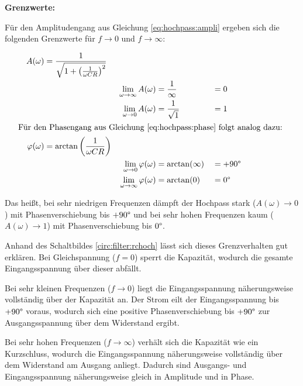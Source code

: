 \begin{frame}
{    \textbf{Grenzwerte:}

    Für den Amplitudengang aus Gleichung \ref{eq:hochpass:ampli} ergeben sich die folgenden Grenzwerte 
    für $f \rightarrow 0$ und $f \rightarrow \infty$:
    
    \begin{align}
        &&A(\omega) &=\frac{1}{\sqrt{1 + \left(\frac{1}{\omega CR}\right)^2}}&  &                   &&          &&\nonumber\\
        &&          &&  \lim_{\omega \rightarrow \infty}A(\omega)               &=\frac{1}{\infty}  &&=0        &&\label{eq:tiefpass:ampli:lim}\\
        &&          &&  \lim_{\omega \rightarrow 0}A(\omega)                    &=\frac{1}{\sqrt{1}}&&=1        &&\nonumber
    \\\intertext{%
    Für den Phasengang aus Gleichung \ref{eq:hochpass:phase} folgt analog dazu:
    }%
        &&\varphi(\omega)   &=\arctan\left(\frac{1}{\omega CR}\right)&          &                   &&          &&\nonumber\\
        &&          &&  \lim_{\omega \rightarrow 0}\varphi(\omega)              &=\arctan(\infty)   &&=+90\degree&&\label{eq:tiefpass:phase:lim}\\
        &&          &&  \lim_{\omega \rightarrow \infty}\varphi(\omega)          &=\arctan(0)        &&=0\degree &&\nonumber
    \end{align}

    Das heißt, bei sehr niedrigen Frequenzen dämpft der Hochpass stark ($A(\omega) \rightarrow 0$) mit Phasenverschiebung bis $+90\degree$
    und bei sehr hohen Frequenzen kaum ($A(\omega) \rightarrow 1$) mit Phasenverschiebung bis $0\degree$.

    Anhand des Schaltbildes \ref{circ:filter:rchoch} lässt sich dieses Grenzverhalten gut erklären.
    Bei Gleichspannung ($f=0$) sperrt die Kapazität, wodurch die gesamte Eingangsspannung über dieser abfällt.
     
    Bei sehr kleinen Frequenzen ($f \to 0$) liegt die Eingangsspannung näherungsweise vollständig über der Kapazität an. 
    Der Strom eilt der Eingangsspannung bis $+90\degree$ voraus, wodurch sich eine positive Phasenverschiebung 
    bis $+90\degree$ zur Ausgangsspannung über dem Widerstand ergibt.

    Bei sehr hohen Frequenzen ($f \rightarrow \infty$) verhält sich die Kapazität wie ein Kurzschluss, 
    wodurch die Eingangsspannung näherungsweise vollständig über dem Widerstand am Ausgang anliegt.
    Dadurch sind Ausgangs- und Eingangsspannung näherungsweise gleich in Amplitude und in Phase.

}
\end{frame}
